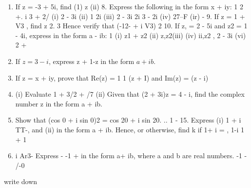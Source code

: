 \documentclass[12pt, a4paper]{report}
\theoremstyle{plain}
\theoremstyle{definition}
\theoremstyle{remark}
\begin{document}
\begin{enumerate}
\item  If z = -3 + 5i, find (1) z (ii) 8. Express the following in the form x + iy: 1 2 +. i 3 + 2/  (i) 2 - 3i (ii) 1 2i (iii) 2 - 3i 
2i  3 - 2i (iv) 27--F (ir) - 9. If z = 1 + V3 , find z 2. 3 Hence verify that (-12- + i V3) 2 10. If z, = 2 - 5i and z2 = 1 - 4i, express in the form a - ib: 1 (i) z1 + z2 (ii) z,z2(iii) (iv) ii,z2 ,  
2 - 3i (vi) 2 + 
\item  If $z = 3 - i$, express z + 1-z in the form $a + ib$. 
\item  If z = x + iy, prove that Re(z) = 1 1 (z + I) and Im(z) = (z - i) \item  (i) Evaluate 1 + 3/2 + /7 (ii) Given that (2 + 3i)z = 4 - i, find the complex number z in the form a + ib. 

\item  Show that (cos 0 + i sin 0)2 = cos 20 + i sin 20. .. 1 - 15. Express (i) 1 + i TT-, and (ii) in the form a + ib. Hence, or otherwise, find k if 1+ i = , 1-i 1 + 1 
\item i Ar3- Express - -1 +  in the form a+ ib, where a and b are real numbers. -1 - /-0 
\end{enumerate}
write down 
\end{document}
